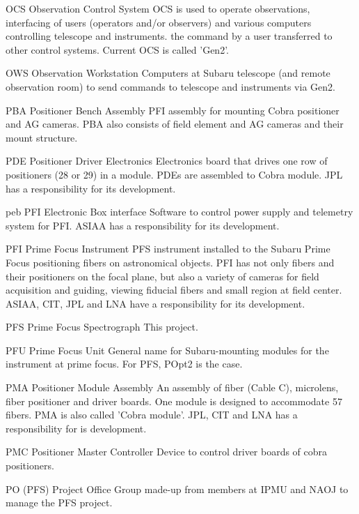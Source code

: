 {OCS}
{Observation Control System}
{OCS is used to operate observations, interfacing of users (operators and/or observers) and various computers controlling telescope and instruments. the command by a user transferred to other control systems. Current OCS is called 'Gen2'.}


{OWS}
{Observation Workstation}
{Computers at Subaru telescope (and remote observation room) to send commands to telescope and instruments via Gen2.}


{PBA}
{Positioner Bench Assembly}
{PFI assembly for mounting Cobra positioner and AG cameras. PBA also consists of field element and AG cameras and their mount structure.}


{PDE}
{Positioner Driver Electronics}
{Electronics board that drives one row of positioners (28 or 29) in a module. PDEs are assembled to Cobra module. JPL has a responsibility for its development.}


{peb}
{PFI Electronic Box interface}
{Software to control power supply and telemetry system for PFI. ASIAA has a responsibility for its development.}


{PFI}
{Prime Focus Instrument}
{PFS instrument installed to the Subaru Prime Focus positioning fibers on astronomical objects. PFI has not only fibers and their positioners on the focal plane, but also a variety of cameras for field acquisition and guiding, viewing fiducial fibers and small region at field center. ASIAA, CIT, JPL and LNA have a responsibility for its development.}


{PFS}
{Prime Focus Spectrograph}
{This project.}


{PFU}
{Prime Focus Unit}
{General name for Subaru-mounting modules for the instrument at prime focus. For PFS, POpt2 is the case.}


{PMA}
{Positioner Module Assembly}
{An assembly of fiber (Cable C), microlens, fiber positioner and driver boards. One module is designed to accommodate 57 fibers. PMA is also called 'Cobra module'. JPL, CIT and LNA has a responsibility for is development.}


{PMC}
{Positioner Master Controller}
{Device to control driver boards of cobra positioners.}


{PO}
{(PFS) Project Office}
{Group made-up from members at IPMU and NAOJ to manage the PFS project.}


